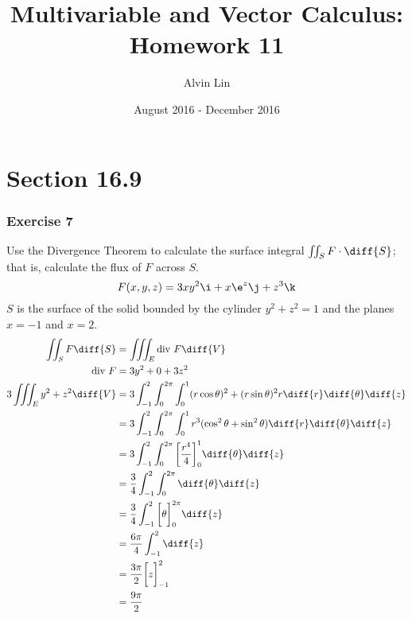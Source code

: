 \documentclass{math}
\title{Multivariable and Vector Calculus: Homework 11}
\author{Alvin Lin}
\date{August 2016 - December 2016}
\begin{document}
\maketitle

\section*{Section 16.9}

\subsubsection*{Exercise 7}
Use the Divergence Theorem to calculate the surface integral
\( \iint_{S}F\cdot\diff{S} \); that is, calculate the flux of \( F \) across
\( S \).
\[ F(x,y,z) = 3xy^2\i+x\e^z\j+z^3\k \]
\( S \) is the surface of the solid bounded by the cylinder \( y^2+z^2 = 1 \)
and the planes \( x = -1 \) and \( x = 2 \).
\begin{align*}
  \iint_{S}F\diff{S} &= \iiint_{E}\text{div}~F\diff{V} \\
  \text{div}~F &= 3y^2+0+3z^2 \\
  3\iiint_{E}y^2+z^2\diff{V} &=
    3\int_{-1}^{2}\int_{0}^{2\pi}\int_{0}^{1}(r\cos\theta)^2+(r\sin\theta)^2r
    \diff{r}\diff{\theta}\diff{z} \\
  &= 3\int_{-1}^{2}\int_{0}^{2\pi}\int_{0}^{1}r^3(\cos^2\theta+\sin^2\theta)
    \diff{r}\diff{\theta}\diff{z} \\
  &= 3\int_{-1}^{2}\int_{0}^{2\pi}\bigg[\frac{r^4}{4}\bigg]_{0}^{1}
    \diff{\theta}\diff{z} \\
  &= \frac{3}{4}\int_{-1}^{2}\int_{0}^{2\pi}\diff{\theta}\diff{z} \\
  &= \frac{3}{4}\int_{-1}^{2}\bigg[\theta\bigg]_{0}^{2\pi}\diff{z} \\
  &= \frac{6\pi}{4}\int_{-1}^{2}\diff{z} \\
  &= \frac{3\pi}{2}\bigg[z\bigg]_{-1}^{2} \\
  &= \frac{9\pi}{2}
\end{align*}
\end{document}
